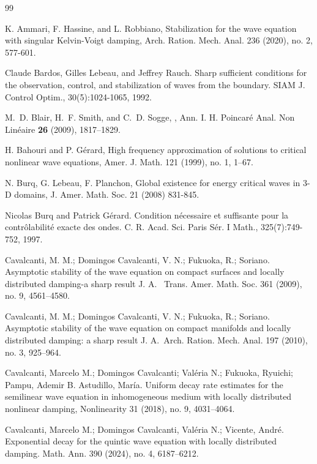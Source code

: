 \documentclass[11pt,letterpaper]{amsart}
\begin{document}
\begin{thebibliography}{99}

 K. Ammari, F. Hassine, and L. Robbiano, Stabilization for the wave equation with singular Kelvin-Voigt
damping, Arch. Ration. Mech. Anal. 236 (2020), no. 2, 577-601.

Claude Bardos, Gilles Lebeau, and Jeffrey Rauch. Sharp sufficient conditions
for the observation, control, and stabilization of waves from the
boundary. SIAM J. Control Optim., 30(5):1024-1065, 1992.


 M.~D. Blair, H.~F. Smith, and C.~D. Sogge,
,
\newblock Ann. I. H. Poincar\'e Anal. Non Lin\'eaire {\bf 26} (2009), 1817--1829.

 H. Bahouri and P. G\'erard, High frequency approximation of solutions to critical nonlinear wave equations, Amer. J. Math. 121 (1999), no. 1, 1–67.

 N. Burq, G. Lebeau, F. Planchon, Global existence for energy critical waves in 3-D domains, J. Amer. Math. Soc. 21 (2008) 831-845.


 Nicolas Burq and Patrick G\'erard. Condition n\'ecessaire et suffisante pour la contr\^olabilit\'e exacte des
ondes. C. R. Acad. Sci. Paris S\'er. I Math., 325(7):749-752, 1997.

 Cavalcanti, M. M.; Domingos Cavalcanti, V. N.; Fukuoka, R.; Soriano. Asymptotic stability of the wave equation on compact surfaces and locally distributed damping-a sharp result
 J. A. ~Trans. Amer. Math. Soc. 361 (2009), no. 9, 4561–4580.

 Cavalcanti, M. M.; Domingos Cavalcanti, V. N.; Fukuoka, R.; Soriano. Asymptotic stability of the wave equation on compact manifolds and locally distributed damping: a sharp result
 J. A.~Arch. Ration. Mech. Anal. 197 (2010), no. 3,
925–964.


Cavalcanti, Marcelo M.; Domingos Cavalcanti; Valéria N.; Fukuoka, Ryuichi; Pampu, Ademir B. Astudillo, María. Uniform decay rate estimates for the semilinear wave equation in inhomogeneous medium with locally distributed nonlinear damping, Nonlinearity 31 (2018), no. 9, 4031–4064.

 Cavalcanti, Marcelo M.; Domingos Cavalcanti, Val\'eria N.; Vicente, Andr\'e. Exponential decay for the quintic wave equation with locally distributed damping.  Math. Ann. 390 (2024), no. 4, 6187–6212.


\end{thebibliography}
\end{document}
